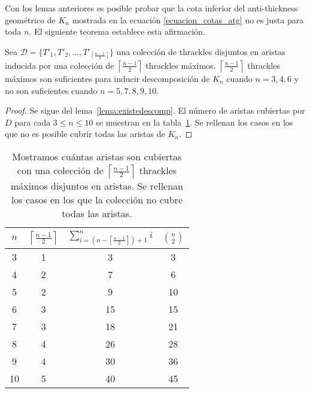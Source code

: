 Con los lemas anteriores es posible probar que la cota inferior del
anti-thickness geométrico de $K_n$ mostrada en la ecuación
\ref{ecuacion_cotas_atg} no es justa para toda $n$. El siguiente teorema
establece esta afirmación.
\begin{theorem}\label{teo:cotainf}
Sea $\mathcal{D}=\{T'_1,T'_2,\dots,T'_{\left\lceil\frac{n-1}{2}\right\rceil}\}$
una colección de thrackles disjuntos en aristas inducida por una colección de
$\left\lceil\frac{n-1}{2}\right\rceil$ thrackles máximos.
$\left\lceil\frac{n-1}{2}\right\rceil$ thrackles máximos son
suficientes para inducir descomposición de $K_n$ cuando $n={3,4,6}$ y no son suficientes cuando $n={5,7,8,9,10}$.
\end{theorem}
\begin{proof}
  Se sigue del lema~\ref{lema:existedescomp}. El número de aristas cubiertas
  por $D$ para cada $3\leq n \leq 10$ se muestran en la
  tabla~\ref{table:attrivialtight}. Se rellenan los casos en los que no es
  posible cubrir todas las aristas de $K_n$.
\end{proof}

\begin{table}[t]
  \centering
  \begin{tabular}{|c|c|c|c|}
    \hline
    $n$ & $\left\lceil\frac{n-1}{2}\right\rceil$ &
    $\sum^n_{i=\left(n-\left\lceil\frac{n-1}{2}\right\rceil\right) + 1}i$ &
    $\binom{n}{2}$\\[5pt] \hline\hline
    3   & 1  & 3 & 3 \\ \hline
    4   & 2  & 7 & 6 \\ \hline
    5   & 2  & \cellcolor{red!25}9 & 10 \\ \hline
    6   & 3  & 15 & 15 \\ \hline
    7   & 3  & \cellcolor{red!25}18 & 21 \\ \hline
    8   & 4  & \cellcolor{red!25}26 & 28 \\ \hline
    9   & 4  & \cellcolor{red!25}30 & 36 \\ \hline
    10  & 5  & \cellcolor{red!25}40 & 45 \\ \hline
  \end{tabular}
  \caption{ Mostramos cuántas aristas son cubiertas con una colección de
  $\left\lceil\frac{n-1}{2}\right\rceil$ thrackles máximos disjuntos en
  aristas. Se rellenan los casos en los que la colección no cubre todas las
  aristas. }
  \label{table:attrivialtight}
\end{table}

